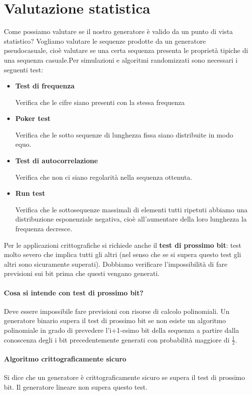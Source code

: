 \section{Valutazione statistica}
Come possiamo valutare se il nostro generatore è valido da un punto di vista statistico? Vogliamo valutare le sequenze prodotte da un generatore pseudocasuale, cioè valutare se una certa sequenza presenta le proprietà tipiche di una sequenza casuale.Per simulazioni e algoritmi randomizzati sono necessari i seguenti test: 
\begin{itemize}
	\item \textbf{Test di frequenza}
	
	Verifica che le cifre siano presenti con la stessa frequenza
	\item \textbf{Poker test}
	
	Verifica che le sotto sequenze di lunghezza fissa siano distribuite in modo equo.
	\item \textbf{Test di autocorrelazione}
	
	Verifica che non ci siano regolarità nella sequenza ottenuta.
	\item \textbf{Run test}
	
	Verifica che le sottosequenze massimali di elementi tutti ripetuti abbiamo una distribuzione esponenziale negativa, cioè all’aumentare della loro lunghezza la frequenza decresce.
\end{itemize}
Per le applicazioni crittografiche si richiede anche il \textbf{test di prossimo bit}: test molto severo che implica tutti gli altri (nel senso che se si supera questo test gli altri sono sicuramente superati). Dobbiamo verificare l’impossibilità di fare previsioni sui bit prima che questi vengano generati.

\paragraph{Cosa si intende con test di prossimo bit?} Deve essere impossibile fare previsioni con risorse di calcolo polinomiali.
Un generatore binario supera il test di prossimo bit se non esiste un algoritmo polinomiale in grado di prevedere l’i+1-esimo bit della sequenza a partire dalla conoscenza degli i bit precedentemente generati con probabilità maggiore di $\frac{1}{2}$.

\paragraph{Algoritmo crittograficamente sicuro} Si dice che un generatore è crittograficamente sicuro se supera il test di prossimo bit. Il generatore lineare non supera questo test.
\clearpage 


